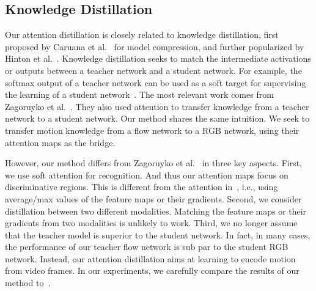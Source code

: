 \documentclass[10pt,twocolumn,letterpaper]{article}
\begin{document}

\subsection{Knowledge Distillation}
Our attention distillation is closely related to knowledge distillation, first proposed by Caruana et al.\ \cite{buciluǎ2006model} for model compression, and further popularized by Hinton et al.\ \cite{hinton2015distilling}. Knowledge distillation seeks to match the intermediate activations or outputs between a teacher network and a student network. For example, the softmax output of a teacher network can be used as a soft target for supervising the learning of a student network~\cite{hinton2015distilling}. The most relevant work comes from Zagoruyko et al.\ \cite{Zagoruyko2017AT}. They also used attention to transfer knowledge from a teacher network to a student network. Our method shares the same intuition. We seek to transfer motion knowledge from a flow network to a RGB network, using their attention maps as the bridge. 

However, our method differs from Zagoruyko et al.\ \cite{Zagoruyko2017AT} in three key aspects. First, we use soft attention for recognition. And thus our attention maps focus on discriminative regions. This is different from the attention in~\cite{Zagoruyko2017AT}, i.e., using average/max values of the feature maps or their gradients. Second, we consider distillation between two different modalities. Matching the feature maps or their gradients from two modalities is unlikely to work. Third, we no longer assume that the teacher model is superior to the student network. In fact, in many cases, the performance of our teacher flow network is sub par to the student RGB network. Instead, our attention distillation aims at learning to encode motion from video frames. In our experiments, we carefully compare the results of our method to~\cite{Zagoruyko2017AT}.
\end{document}
